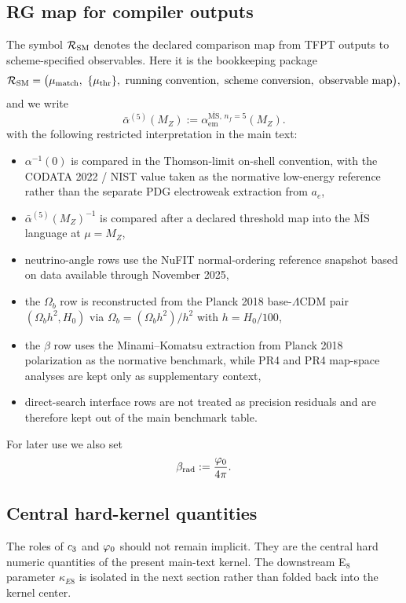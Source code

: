 \subsection{RG map for compiler outputs}

The symbol $\mathcal R_{\mathrm{SM}}$ denotes the declared comparison map from TFPT outputs to scheme-specified observables. Here it is the bookkeeping package
\[
\mathcal R_{\mathrm{SM}}
=
\bigl(
\mu_{\mathrm{match}},\ \{\mu_{\mathrm{thr}}\},\ \text{running convention},\ \text{scheme conversion},\ \text{observable map}
\bigr),
\]
and we write
\[
\bar\alpha^{(5)}(M_Z):=\alpha_{\mathrm{em}}^{\overline{\mathrm{MS}},\,n_f=5}(M_Z).
\]
with the following restricted interpretation in the main text:
\begin{itemize}[leftmargin=1.5em, topsep=3pt, itemsep=2pt]
    \item $\alpha^{-1}(0)$ is compared in the Thomson-limit on-shell convention, with the CODATA 2022 / NIST value taken as the normative low-energy reference rather than the separate PDG electroweak extraction from $a_e$,
    \item $\bar\alpha^{(5)}(M_Z)^{-1}$ is compared after a declared threshold map into the $\overline{\mathrm{MS}}$ language at $\mu=M_Z$,
    \item neutrino-angle rows use the NuFIT normal-ordering reference snapshot based on data available through November 2025,
    \item the $\Omega_b$ row is reconstructed from the Planck 2018 base-$\Lambda$CDM pair $(\Omega_b h^2,H_0)$ via $\Omega_b=(\Omega_b h^2)/h^2$ with $h=H_0/100$,
    \item the $\beta$ row uses the Minami--Komatsu extraction from Planck 2018 polarization as the normative benchmark, while PR4 and PR4 map-space analyses are kept only as supplementary context,
    \item direct-search interface rows are not treated as precision residuals and are therefore kept out of the main benchmark table.
\end{itemize}
For later use we also set
\[
\beta_{\mathrm{rad}}:=\frac{\varphi_0}{4\pi}.
\]

\subsection{Central hard-kernel quantities}

The roles of $c_3$ and $\varphi_0$ should not remain implicit. They are the central hard numeric quantities of the present main-text kernel. The downstream E$_8$ parameter $\kappa_{E8}$ is isolated in the next section rather than folded back into the kernel center.

